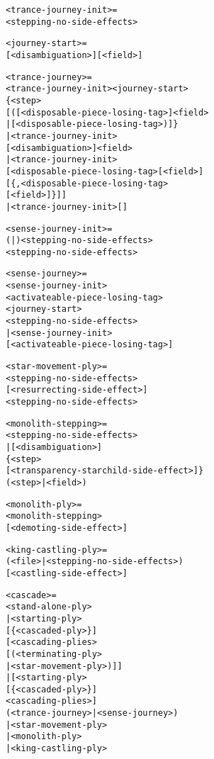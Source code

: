 \begin{alltt}
<trance-journey-init> =
  <stepping-no-side-effects>

<journey-start> =
  [<disambiguation>][\alg{\textbackslash}<field>]

<trance-journey> =
  <trance-journey-init><journey-start>
  \{<step>
    [(\alg{<}[<disposable-piece-losing-tag>]<field>
      | \alg{*}[<disposable-piece-losing-tag>)]\}
| <trance-journey-init>
    [<disambiguation>]<field>
| <trance-journey-init>
  [<disposable-piece-losing-tag>[<field>]
    [\{,<disposable-piece-losing-tag>
      [<field>]\}]]
| <trance-journey-init>[]

<sense-journey-init> =
  (|)<stepping-no-side-effects>
  <stepping-no-side-effects>

<sense-journey> =
  <sense-journey-init>
  <activateable-piece-losing-tag>
  <journey-start>
  <stepping-no-side-effects>
| <sense-journey-init>
  [<activateable-piece-losing-tag>]
\end{alltt}

\clearpage %

\begin{alltt}
<star-movement-ply> =
  <stepping-no-side-effects>
    [<resurrecting-side-effect>]
    \alg{~}<stepping-no-side-effects>

<monolith-stepping> =
  <stepping-no-side-effects>
| [<disambiguation>]
  \{<step>
    [<transparency-starchild-side-effect>]\}
  (<step> | \alg{-}<field>)

<monolith-ply> =
  <monolith-stepping>
  [<demoting-side-effect>]

<king-castling-ply> =
  (<file> | <stepping-no-side-effects>)
  [<castling-side-effect>]

<cascade> =
  <stand-alone-ply>
| <starting-ply>
  [\{<cascading-plies>\alg{~}<cascaded-ply>\}]
  [<cascading-plies>
    [\alg{~}(<terminating-ply>
      | <star-movement-ply>)]]
| [<starting-ply>
    [\{<cascading-plies>\alg{~}<cascaded-ply>\}]
    <cascading-plies>\alg{~}]
  (<trance-journey> | <sense-journey>)
| <star-movement-ply>
| <monolith-ply>
| <king-castling-ply>
\end{alltt}

\clearpage %

